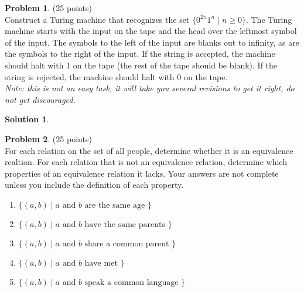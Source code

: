 \documentclass{article}
\theoremstyle{definition}
\newtheorem{problem}{Problem}
\newtheorem*{solution}{Solution}
\begin{document}
\begin{problem} (25 points)\\
Construct a Turing machine that recognizes the set $\{0^{2n}1^n \mid n\geq 0\}$.  The Turing machine starts with the input on the tape and the head over the leftmost symbol of the input.  The symbols to the left of the input are blanks out to infinity, as are the symbols to the right of the input.  If the string is accepted, the machine should halt with 1 on the tape (the rest of the tape should be blank).  If the string is rejected, the machine should halt with 0 on the tape.\\
\textit{Note: this is not an easy task, it will take you several revisions to get it right, do not get discouraged.}
\end{problem}

\begin{solution}\ \\

\end{solution}

\newpage

\begin{problem} (25 points)\\
For each relation on the set of all people, determine whether it is an equivalence realtion.  For each relation that is not an equivalence relation, determine which properties of an equivalence relation it lacks.  Your answers are not complete unless you include the definition of each property.
\begin{enumerate}
\item $\{(a,b) \mid a \text{ and } b \text{ are the same age }\}$
\item $\{(a,b) \mid a \text{ and } b \text{ have the same parents }\}$
\item $\{(a,b) \mid a \text{ and } b \text{ share a common parent }\}$
\item $\{(a,b) \mid a \text{ and } b \text{ have met }\}$
\item $\{(a,b) \mid a \text{ and } b \text{ speak a common language }\}$
\end{enumerate}
\end{problem}
\end{document}
